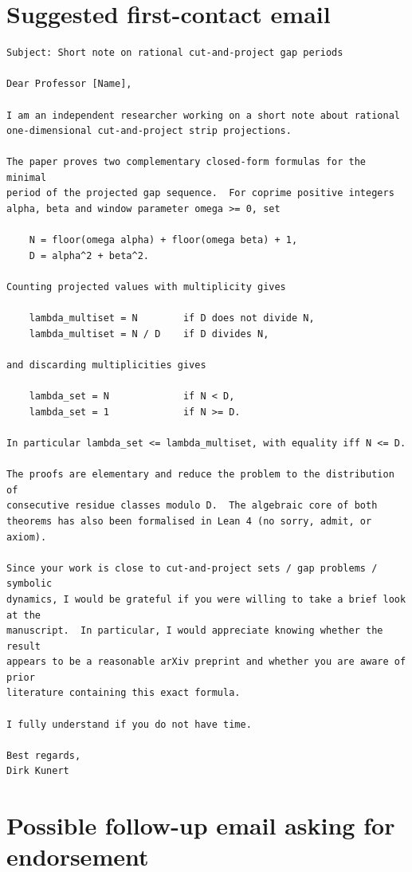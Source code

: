 \documentclass[11pt]{article}
\begin{document}
\section*{Suggested first-contact email}

\begin{verbatim}
Subject: Short note on rational cut-and-project gap periods

Dear Professor [Name],

I am an independent researcher working on a short note about rational
one-dimensional cut-and-project strip projections.

The paper proves two complementary closed-form formulas for the minimal
period of the projected gap sequence.  For coprime positive integers
alpha, beta and window parameter omega >= 0, set

    N = floor(omega alpha) + floor(omega beta) + 1,
    D = alpha^2 + beta^2.

Counting projected values with multiplicity gives

    lambda_multiset = N        if D does not divide N,
    lambda_multiset = N / D    if D divides N,

and discarding multiplicities gives

    lambda_set = N             if N < D,
    lambda_set = 1             if N >= D.

In particular lambda_set <= lambda_multiset, with equality iff N <= D.

The proofs are elementary and reduce the problem to the distribution of
consecutive residue classes modulo D.  The algebraic core of both
theorems has also been formalised in Lean 4 (no sorry, admit, or axiom).

Since your work is close to cut-and-project sets / gap problems / symbolic
dynamics, I would be grateful if you were willing to take a brief look at the
manuscript.  In particular, I would appreciate knowing whether the result
appears to be a reasonable arXiv preprint and whether you are aware of prior
literature containing this exact formula.

I fully understand if you do not have time.

Best regards,
Dirk Kunert
\end{verbatim}

\section*{Possible follow-up email asking for endorsement}
\end{document}
